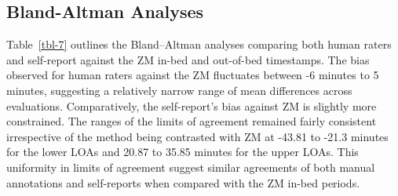 \documentclass[
  10pt,
]{scrbook}
\begin{document}
\endgroup

\hypertarget{bland-altman-analyses}{%
\subsection{Bland-Altman Analyses}\label{bland-altman-analyses}}

Table~\ref{tbl-7} outlines the Bland--Altman analyses comparing both
human raters and self-report against the ZM in-bed and out-of-bed
timestamps. The bias observed for human raters against the ZM fluctuates
between -6 minutes to 5 minutes, suggesting a relatively narrow range of
mean differences across evaluations. Comparatively, the self-report's
bias against ZM is slightly more constrained. The ranges of the limits
of agreement remained fairly consistent irrespective of the method being
contrasted with ZM at -43.81 to -21.3 minutes for the lower LOAs and
20.87 to 35.85 minutes for the upper LOAs. This uniformity in limits of
agreement suggest similar agreements of both manual annotations and
self-reports when compared with the ZM in-bed periods.

\begingroup

\footnotesize
\end{document}
